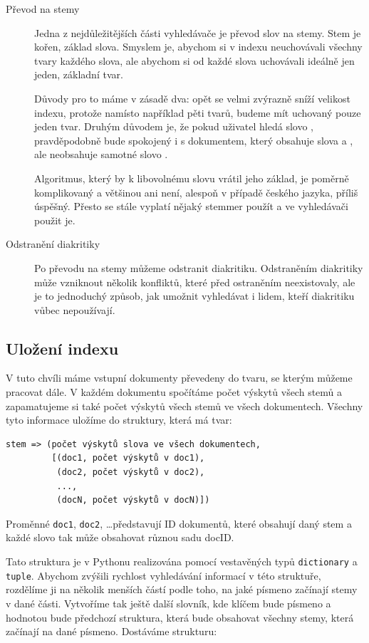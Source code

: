 \documentclass[12pt]{article}
\newcommand{\code}[1]{\texttt{#1}}
\begin{document}
\begin{description}
\item[Převod na stemy] Jedna z nejdůležitějších části vyhledávače je převod slov na stemy. Stem je kořen, základ slova. Smyslem je, abychom si v indexu neuchovávali všechny tvary každého slova, ale abychom si od každé slova uchovávali ideálně jen jeden, základní tvar. 

Důvody pro to máme v zásadě dva: opět se velmi zvýrazně sníží velikost indexu, protože namísto například pěti tvarů, budeme mít uchovaný pouze jeden tvar. Druhým důvodem je, že pokud uživatel hledá slovo , pravděpodobně bude spokojený i s dokumentem, který obsahuje slova  a , ale neobsahuje samotné slovo . 

Algoritmus, který by k libovolnému slovu vrátil jeho základ, je poměrně komplikovaný a většinou ani není, alespoň v případě českého jazyka, příliš úspěšný. Přesto se stále vyplatí nějaký stemmer použít a ve vyhledávači použit je. 

\item[Odstranění diakritiky] Po převodu na stemy můžeme odstranit diakritiku. Odstraněním diakritiky může vzniknout několik konfliktů, které před ostraněním neexistovaly, ale je to jednoduchý způsob, jak umožnit vyhledávat i lidem, kteří diakritiku vůbec nepoužívají. 
\end{description} 


\subsection{Uložení indexu}
V tuto chvíli máme vstupní dokumenty převedeny do tvaru, se kterým můžeme pracovat dále. V každém dokumentu spočítáme počet výskytů všech stemů a zapamatujeme si také počet výskytů všech stemů ve všech dokumentech. Všechny tyto informace uložíme do struktury, která má tvar:

\begin{verbatim}
stem => (počet výskytů slova ve všech dokumentech, 
         [(doc1, počet výskytů v doc1), 
          (doc2, počet výskytů v doc2), 
          ..., 
          (docN, počet výskytů v docN)])
\end{verbatim}

Proměnné \code{doc1}, \code{doc2}, \dots představují ID dokumentů, které obsahují daný stem a každé slovo tak může obsahovat různou sadu docID. 

Tato struktura je v Pythonu realizována pomocí vestavěných typů \code{dictionary} a \code{tuple}. Abychom zvýšili rychlost vyhledávání informací v této struktuře, rozdělíme ji na několik menších částí podle toho, na jaké písmeno začínají stemy v dané části. Vytvoříme tak ještě další slovník, kde klíčem bude písmeno a hodnotou bude předchozí struktura, která bude obsahovat všechny stemy, která začínají na dané písmeno. Dostáváme strukturu:
\end{document}
